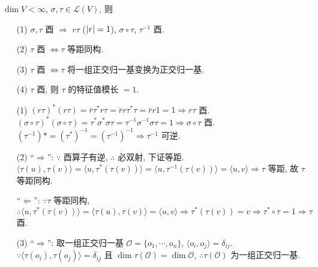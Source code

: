 \documentclass{note}
\begin{document}
\begin{thm}
    $\dim V<\infty$, $\sigma,\tau\in\mathcal{L}(V)$, 则
    \begin{itemize}
        \item[(1)] $\sigma,\tau$ 酉 $\Longrightarrow$ $r\tau$ ($\left\lvert r\right\rvert=1$), $\sigma\circ\tau$, $\tau^{-1}$ 酉.
        \item[(2)] $\tau$ 酉 $\Longleftrightarrow\tau$ 等距同构.
        \item[(3)] $\tau$ 酉 $\Longleftrightarrow\tau$ 将一组正交归一基变换为正交归一基.
        \item[(4)] $\tau$ 酉, 则 $\tau$ 的特征值模长 $=1$.
    \end{itemize}
\end{thm}
\begin{pf}
    \begin{itemize}
        \item[(1)] $(r\tau)^*(r\tau)=\bar{r}\tau^*r\tau=\bar{r}r\tau^*\tau=\bar{r}r1=1\Longrightarrow r\tau$ 酉.\\
        $(\sigma\circ\tau)^*(\sigma\circ\tau)=\tau^*\sigma^*\sigma\tau=\tau^{-1}\sigma^{-1}\sigma\tau=1\Longrightarrow\sigma\circ\tau$ 酉.\\
        $(\tau^{-1})*=(\tau^*)^{-1}=(\tau^{-1})^{-1}\Longrightarrow\tau^{-1}$ 可逆.
        \item[(2)] ``$\Longrightarrow$'': $\because$ 酉算子有逆, $\therefore$ 必双射, 下证等距.\\
        $\langle\tau(u),\tau(v)\rangle=\langle u,\tau^*(\tau(v))\rangle=\langle u,\tau^{-1}(\tau(v))\rangle=\langle u,v\rangle\Longrightarrow\tau$ 等距, 故 $\tau$ 等距同构.

        ``$\Longleftarrow$'': $\because\tau$ 等距同构, $\therefore\langle u,\tau^*(\tau(v))\rangle=\langle\tau(u),\tau(v)\rangle=\langle u,v\rangle\Longrightarrow\tau^*(\tau(v))=v\Longrightarrow\tau^*\circ\tau=1\Longrightarrow\tau$ 酉.
        \item[(3)] ``$\Longrightarrow$'': 取一组正交归一基 $\mathcal{O}=\{o_1,\cdots,o_n\}$, $\langle o_i,o_j\rangle=\delta_{ij}$.\\
        $\because\langle\tau(o_i),\tau(o_j)\rangle=\delta_{ij}$ 且 $\dim\tau(\mathcal{O})=\dim\mathcal{O}$, $\therefore\tau(\mathcal{O})$ 为一组正交归一基.


\end{itemize}
\end{pf}
\end{document}
